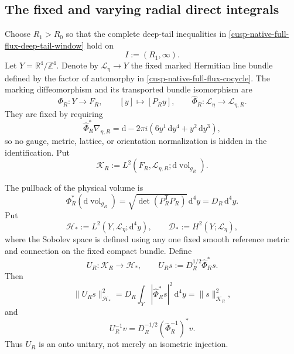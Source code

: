 

\subsection{The fixed and varying radial direct integrals}
\label{cusp-native-full-flux-radial-section}

Choose \(R_1>R_0\) so that the complete deep-tail inequalities in
\cref{cusp-native-full-flux-deep-tail-window} hold on
\[
 I:=(R_1,\infty).
\]
Let \(Y=\mathbb R^4/\mathbb Z^4\).  Denote by
\(\mathscr L_\eta\to Y\) the fixed marked Hermitian line bundle defined
by the factor of automorphy in
\cref{cusp-native-full-flux-cocycle}.  The marking diffeomorphism and its
transported bundle isomorphism are
\[
 \Phi_R:Y\longrightarrow F_R,\qquad [y]\longmapsto[P_Ry],
 \qquad
 \widehat\Phi_R:\mathscr L_\eta\longrightarrow\mathscr L_{\eta,R}.
\]
They are fixed by requiring
\[
 \widehat\Phi_R^*\nabla_{\eta,R}
 =\mathrm d-2\pi i(6y^1\,\mathrm dy^4+y^2\,\mathrm dy^3),
\]
so no gauge, metric, lattice, or orientation normalization is hidden in the
identification.  Put
\[
 \mathscr K_R
 :=L^2(F_R,\mathscr L_{\eta,R};
       \mathrm d\operatorname{vol}_{g_R}).
\]

The pullback of the physical volume is
\begin{equation}
 \Phi_R^*(\mathrm d\operatorname{vol}_{g_R})
 =\sqrt{\det(P_R^{\mathsf T}P_R)}\,\mathrm d^4y
 =D_R\,\mathrm d^4y.
\label{native-di-volume-pullback}
\end{equation}
Put
\[
 \mathscr H_*:=L^2(Y,\mathscr L_\eta;\mathrm d^4y),
 \qquad
 \mathscr D_*:=H^2(Y;\mathscr L_\eta),
\]
where the Sobolev space is defined using any one fixed smooth reference
metric and connection on the fixed compact bundle.  Define
\begin{equation}
 U_R:\mathscr K_R\longrightarrow\mathscr H_*,
 \qquad
 U_Rs:=D_R^{1/2}\widehat\Phi_R^*s.
\label{native-di-marking-unitary}
\end{equation}
Then
\[
 \|U_Rs\|_{\mathscr H_*}^2
 =D_R\int_Y|\widehat\Phi_R^*s|^2\,\mathrm d^4y
 =\|s\|_{\mathscr K_R}^2,
\]
and
\[
 U_R^{-1}v
 =D_R^{-1/2}(\widehat\Phi_R^{-1})^*v.
\]
Thus \(U_R\) is an onto unitary, not merely an isometric injection.

